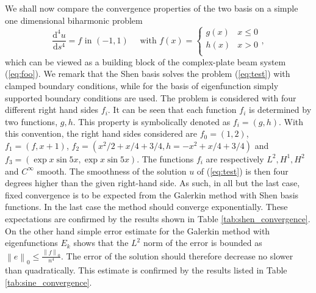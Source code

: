 \documentclass{marine_2015}
\newcommand{\inner}[2]{\ensuremath{\left(#1, #2\right)}}
\newcommand{\norm}[1]{\ensuremath{\left\|#1\right\|}}
\newcommand{\deriv}[2]{\ensuremath{\frac{\mathrm{d}#1}{\mathrm{d}#2}}}
\begin{document}
We shall now compare the convergence properties of the two basis on a simple one
dimensional biharmonic problem
\begin{equation}
  \label{eq:test}
  \deriv{^4u}{s^4} = f\text{ in }\left(-1, 1 \right)\quad\text{ with }f(x)=\begin{cases}
      g(x) & x \leq 0 \\
      h(x) & x > 0 \\
    \end{cases},
  \end{equation}
which can be viewed as a building block of the complex-plate beam system (\ref{eq:foo}).
We remark that the Shen basis solves the problem (\ref{eq:test}) with clamped
boundary conditions, while for the basis of eigenfunction simply supported
boundary conditions are used. The problem is considered with four different right 
hand sides $f_i$. It can be seen that each function $f_i$ is determined by two functions, $g, h$. This
property is symbolically denoted as $f_i=\left(g, h\right)$. With this
convention, the right hand sides considered are $f_0=\inner{1}{2}$, $f_1=\inner{f}{x+1}$,
$f_2=\inner{x^2/2 + x/4 + 3/4}{h=-x^2 + x/4 + 3/4}$ and
$f_3=\inner{\exp{x}\sin{5x}}{\exp{x}\sin{5x}}$. The functions $f_i$ are
respectively $L^2, H^1, H^2$ and $C^{\infty}$ smooth. The smoothness of the
solution $u$ of (\ref{eq:test}) is then four degrees higher than the given
right-hand side. As such, in all but the last case, fixed convergence is to be
expected from the Galerkin method with Shen basis functions. In the last case
the method should converge exponentially. These expectations are confirmed by
the results shown in Table \ref{tab:shen_convergence}. On the other hand simple error
estimate for the Galerkin method with eigenfunctions $E_k$ shows that the $L^2$
norm of the error is bounded as $\norm{e}_0\leq\tfrac{\norm{f}_0}{n^4}$. The
error of the solution should therefore decrease no slower than quadratically.
This estimate is confirmed by the results listed in Table
\ref{tab:sine_convergence}.
\end{document}
